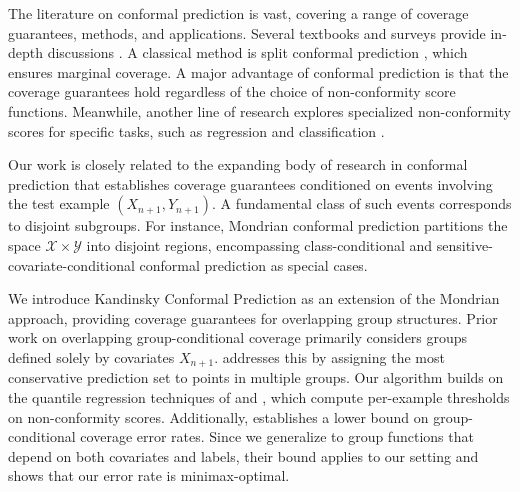 The literature on conformal prediction is vast, covering a range of coverage guarantees, methods, and applications. Several textbooks and surveys provide in-depth discussions \citep{AlgorithmicLearning2005, SV08, BHV14, ABB24}. A classical method is split conformal prediction \citep{PPVG02, LGRTW18}, which ensures marginal coverage. A major advantage of conformal prediction is that the coverage guarantees hold regardless of the choice of non-conformity score functions. Meanwhile, another line of research explores specialized non-conformity scores for specific tasks, such as regression \citep{LeiRW2013, RPC19, IzbickiSS20} and classification \citep{SLW19, ABMJ20, RSC20}.


Our work is closely related to the expanding body of research in conformal prediction that establishes coverage guarantees conditioned on events involving the test example $(X_{n+1}, Y_{n+1})$. A fundamental class of such events corresponds to disjoint subgroups. For instance, Mondrian conformal prediction \citep{VLNG03} partitions the space  $\mathcal{X} \times \mathcal{Y}$ into disjoint regions, encompassing class-conditional \citep{LBLJ15, DABJT23} and sensitive-covariate-conditional \citep{RBSC20} conformal prediction as special cases. 

We introduce Kandinsky Conformal Prediction as an extension of the Mondrian approach, providing coverage guarantees for overlapping group structures. Prior work on overlapping group-conditional coverage primarily considers groups defined solely by covariates  $X_{n+1}$. \citet{BCRT21} addresses this by assigning the most conservative prediction set to points in multiple groups. Our algorithm builds on the quantile regression techniques of \citet{JNRR2023} and \citet{GCC2023}, which compute per-example thresholds on non-conformity scores. Additionally, \citet{ACDR24} establishes a lower bound on group-conditional coverage error rates. Since we generalize to group functions that depend on both covariates and labels, their bound applies to our setting and shows that our error rate is minimax-optimal.


